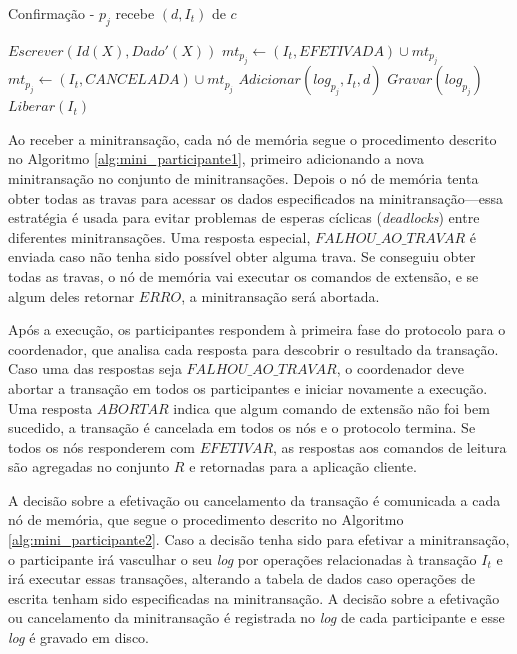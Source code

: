 \documentclass[11pt,twoside,a4paper]{book}
\begin{document}
\begin{algorithm}
    \caption{Confirmação - $p_j$ recebe $(d, I_t)$ de $c$}
    \label{alg:mini_participante2}
    \Inicio
    {
        {    
            {    
                $Escrever(Id(X), Dado'(X))$\;
            }
            $mt_{p_j} \gets (I_t, EFETIVADA) \cup mt_{p_j}$\;
        }
        {
            $mt_{p_j} \gets (I_t, CANCELADA) \cup mt_{p_j}$\;
        }
        $Adicionar(log_{p_j}, I_t, d)$\;
        $Gravar(log_{p_j})$\;
        $Liberar(I_t)$\;
    }
\end{algorithm}

Ao receber a minitransação, cada nó de memória segue o procedimento descrito no Algoritmo \ref{alg:mini_participante1}, primeiro adicionando a nova minitransação no conjunto de minitransações. Depois o nó de memória tenta obter todas as travas para acessar os dados especificados na minitransação---essa estratégia é usada para evitar problemas de esperas cíclicas (\emph{deadlocks}) entre diferentes minitransações. Uma resposta especial, $FALHOU\_AO\_TRAVAR$ é enviada caso não tenha sido possível obter alguma trava. Se conseguiu obter todas as travas, o nó de memória vai executar os comandos de extensão, e se algum deles retornar $ERRO$, a minitransação será abortada.

Após a execução, os participantes respondem à primeira fase do protocolo para o coordenador, que analisa cada resposta para descobrir o resultado da transação. Caso uma das respostas seja $FALHOU\_AO\_TRAVAR$, o coordenador deve abortar a transação em todos os participantes e iniciar novamente a execução. Uma resposta $ABORTAR$ indica que algum comando de extensão não foi bem sucedido, a transação é cancelada em todos os nós e o protocolo termina. Se todos os nós responderem com $EFETIVAR$, as respostas aos comandos de leitura são agregadas no conjunto $R$ e retornadas para a aplicação cliente. 

A decisão sobre a efetivação ou cancelamento da transação é comunicada a cada nó de memória, que segue o procedimento descrito no Algoritmo \ref{alg:mini_participante2}. Caso a decisão tenha sido para efetivar a minitransação, o participante irá vasculhar o seu \emph{log} por operações relacionadas à transação $I_t$ e irá executar essas transações, alterando a tabela de dados caso operações de escrita tenham sido especificadas na minitransação. A decisão sobre a efetivação ou cancelamento da minitransação é registrada no \emph{log} de cada participante e esse \emph{log} é gravado em disco.
\end{document}
